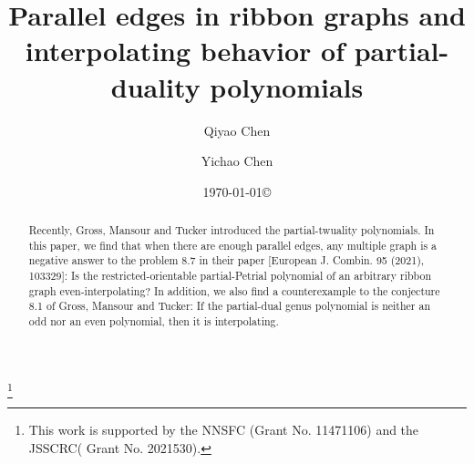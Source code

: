 
\newtheorem{thm}{Theorem}[section]
\newtheorem{cor}[thm]{Corollary}
\newtheorem{lemma}[thm]{Lemma}
\newtheorem{prop}[thm]{Proposition}
\newtheorem{cla}[thm]{Claim}
\newtheorem{pro}[thm]{Problem}
\newtheorem{algo}{Algorithm}[section]
\newtheorem{J-com}{JG-comment}[section]
\theoremstyle{definition}
\newtheorem{example}{Example}[section]
\newtheorem{runex}{Running Example -- part}[section]
\newtheorem{defn}{Definition}[section]
\newtheorem{problem}[thm]{Problem}
\newtheorem{conj}[thm]{Conjecture}
\newtheorem{rem}[thm]{Remark}


\newtheorem{rp}{Research Problem}[section]
\newtheorem{rpstar}[rp]{* Research Problem}


\newcommand{\f}{$\mathcal F$}
\newcommand{\G}{{\mathcal G}}
\newcommand{\ggc}{\circledast}
\newcommand{\cG}{{\mathcal G}}

\newcommand{\ssum} {\sum_{i=1}^{\infty} }
\def\dsum{\displaystyle\sum}
\def\rs{\rm\scriptsize}






\title{ Parallel edges in ribbon graphs and interpolating behavior of partial-duality polynomials}
\thanks{This work is supported by the NNSFC (Grant No. 11471106) and  the JSSCRC( Grant No. 2021530). }
\date{\today\copyright}
\author{Qiyao Chen}
\address{College of Mathematics, Hunan University, 410082 Changsha, China}
\author{Yichao Chen}
\address{College of Mathematics, Hunan University, 410082 Changsha, China}
\maketitle

\begin{abstract}
\textwidth=114.3mm
{ Recently, Gross, Mansour and Tucker introduced the partial-twuality polynomials. %
In this paper, we find that when there are enough parallel edges,
any multiple graph  is a negative answer to the problem 8.7 in their paper [European J. Combin. 95 (2021),
103329]: Is the restricted-orientable partial-Petrial polynomial of an arbitrary ribbon graph  even-interpolating$?$  In addition, we also find a counterexample to the conjecture 8.1 of Gross, Mansour and Tucker:
 If the partial-dual genus polynomial is neither an odd nor an even polynomial, then it is interpolating.}
\end{abstract}


